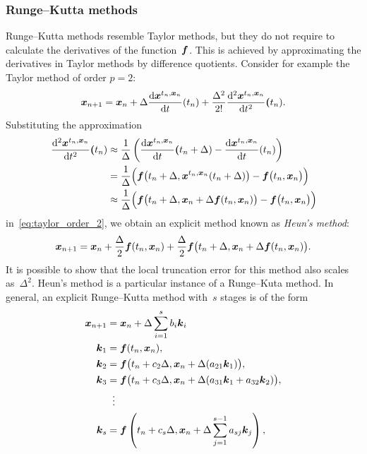 \subsubsection*{Runge--Kutta methods}%
Runge--Kutta methods resemble Taylor methods,
but they do not require to calculate the derivatives of the function~$\mathbf{\boldsymbol{f}}$.
This is achieved by approximating the derivatives in Taylor methods by difference quotients.
Consider for example the Taylor method of order $p = 2$:
\begin{equation}
    \label{eq:taylor_order_2}
    \mathbf{\boldsymbol{x}}_{n+1} = \mathbf{\boldsymbol{x}}_n
    + \Delta \frac{\mathrm d \mathbf{\boldsymbol{x}}^{t_n, \mathbf{\boldsymbol{x}}_n}}{\mathrm d t} (t_n)
    + \frac{\Delta^2}{2!} \frac{\mathrm d^2 \mathbf{\boldsymbol{x}}^{t_n, \mathbf{\boldsymbol{x}}_n}}{\mathrm d t^{2}} \mathbf{\boldsymbol{(}}t_n).
\end{equation}
Substituting the approximation
\begin{align}
    \nonumber
    \frac{\mathrm d^2 \mathbf{\boldsymbol{x}}^{t_n, \mathbf{\boldsymbol{x}}_n}}{\mathrm d t^{2}} \mathbf{\boldsymbol{(}}t_n)
    &\approx \frac{1}{\Delta} \left( \frac{\mathrm d \mathbf{\boldsymbol{x}}^{t_n, \mathbf{\boldsymbol{x}}_n}}{\mathrm d t} \mathbf{\boldsymbol{(}}t_n + \Delta) - \frac{\mathrm d \mathbf{\boldsymbol{x}}^{t_n, \mathbf{\boldsymbol{x}}_n}}{\mathrm d t}(t_n) \right) \\
    \nonumber
    &= \frac{1}{\Delta} \Bigl( \mathbf{\boldsymbol{f}} \bigl( t_n + \Delta, \mathbf{\boldsymbol{x}}^{t_n, \mathbf{\boldsymbol{x}}_n}(t_n + \Delta) \bigr) - \mathbf{\boldsymbol{f}} \bigl( t_{n}, \mathbf{\boldsymbol{x}}_n \bigr) \Bigr) \\
    \label{eq:approx_heun}
    &\approx \frac{1}{\Delta} \Bigl( \mathbf{\boldsymbol{f}} \bigl( t_{n} + \Delta, \mathbf{\boldsymbol{x}}_n + \Delta \mathbf{\boldsymbol{f}}(t_n, \mathbf{\boldsymbol{x}}_n) \bigr) - \mathbf{\boldsymbol{f}} \bigl( t_{n}, \mathbf{\boldsymbol{x}}_n \bigr) \Bigr)
\end{align}
in~\eqref{eq:taylor_order_2},
we obtain an explicit method known as \emph{Heun's method}:
\[
    \mathbf{\boldsymbol{x}}_{n+1} = \mathbf{\boldsymbol{x}}_n
    + \frac{\Delta}{2}\mathbf{\boldsymbol{f}}(t_n, \mathbf{\boldsymbol{x}}_n)
    + \frac{\Delta}{2} \mathbf{\boldsymbol{f}} \bigl( t_n + \Delta, \mathbf{\boldsymbol{x}}_n + \Delta \mathbf{\boldsymbol{f}}(t_n, \mathbf{\boldsymbol{x}}_n) \bigr).
\]
It is possible to show that
the local truncation error for this method also scales as~$\Delta^2$.
Heun's method is a particular instance of a Runge--Kuta method.
In general, an explicit Runge--Kutta method with~$s$ stages is of the form
\begin{align*}
    \mathbf{\boldsymbol{x}}_{n+1} &= \mathbf{\boldsymbol{x}}_n + \Delta \sum_{i=1}^s b_i \mathbf{\boldsymbol{k}}_i \\
    \mathbf{\boldsymbol{k}}_1 &= \mathbf{\boldsymbol{f}}(t_n, \mathbf{\boldsymbol{x}}_n),  \\
    \mathbf{\boldsymbol{k}}_2 &= \mathbf{\boldsymbol{f}}\bigl(t_n + c_2 \Delta, \mathbf{\boldsymbol{x}}_n+\Delta(a_{21} \mathbf{\boldsymbol{k}}_1)\bigr), \\
    \mathbf{\boldsymbol{k}}_3 &= \mathbf{\boldsymbol{f}}\bigl(t_n + c_3 \Delta, \mathbf{\boldsymbol{x}}_n+\Delta(a_{31} \mathbf{\boldsymbol{k}}_1 + a_{32} \mathbf{\boldsymbol{k}}_2)\bigr), \\
              &\;\;\vdots \\
    \mathbf{\boldsymbol{k}}_s &= \mathbf{\boldsymbol{f}}\left(t_n + c_s \Delta, \mathbf{\boldsymbol{x}}_n + \Delta \sum_{j = 1}^{s-1} a_{sj} \mathbf{\boldsymbol{k}}_j\right),
\end{align*}
